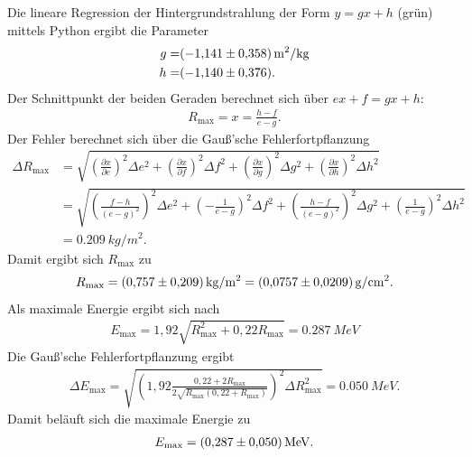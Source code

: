 Die lineare Regression der Hintergrundstrahlung der Form $y=gx+h$ (grün) mittels Python ergibt die Parameter
\begin{align*}
  g=& \SI{-1.141 \pm 0.358}{m^2/kg}\\
  h=& \SI{-1.140 \pm 0.376}{}.
\end{align*}
Der Schnittpunkt der beiden Geraden berechnet sich über $ex+f=gx+h$:
\begin{align*}
  R_{\text{max}}=x=\frac{h-f}{e-g}.
\end{align*}
Der Fehler berechnet sich über die Gauß'sche Fehlerfortpflanzung
\begin{align*}
  \Delta R_{\text{max}}&  =\sqrt{ \left( \frac{\partial x}{\partial e} \right)^2 \Delta e^2 + \left( \frac{\partial x}{\partial f} \right)^2 \Delta f^2 + \left( \frac{\partial x}{\partial g} \right)^2 \Delta g^2 + \left( \frac{\partial x}{\partial h} \right)^2 \Delta h^2 }\\
          &=\sqrt{ \left( \frac{f-h}{(e-g)^2} \right)^2\Delta e^2 + \left( -\frac{1}{e-g} \right)^2\Delta f^2 +\left( \frac{h-f}{(e-g)^2} \right)^2\Delta g^2 +\left( \frac{1}{e-g} \right)^2\Delta h^2} \\
          &= \SI{0.209}{kg/m^2}.
\end{align*}
Damit ergibt sich $R_{\text{max}}$ zu
\begin{align*}
  R_{\text{max}}=\SI{0.757 \pm 0.209}{kg/m^2}= \SI{0.0757 \pm 0.0209}{g/cm^2}.
\end{align*}
Als maximale Energie ergibt sich nach
\begin{align*}
  E_{\text{max}}= 1,92 \sqrt{R_{\text{max}}^2 + 0,22 R_{\text{max}}}= \SI{0.287}{MeV}
\end{align*}
Die Gauß'sche Fehlerfortpflanzung ergibt
\begin{align*}
  \Delta E_{\text{max}}=\sqrt{ \left( 1,92 \frac{0,22+2 R_{\text{max}}}{2 \sqrt{R_{\text{max}}(0,22 + R_{\text{max}})}} \right)^2 \Delta R_{\text{max}}^2}= \SI{0.050}{MeV}.
\end{align*}
Damit beläuft sich die maximale Energie zu
\begin{align*}
  E_{\text{max}}= \SI{0.287 \pm 0.050}{MeV}.
\end{align*}

\FloatBarrier

